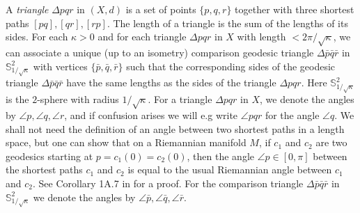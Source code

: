 \documentclass[12pt]{amsart}
\numberwithin{equation}{section}
\theoremstyle{remark}
\begin{document}
	A {\sl triangle} $\Delta pqr$ in $(X,d)$ is a set of points $\{p,q,r\}$ together with three shortest paths $[pq], [qr], [rp]$. The length of a triangle is the sum of the lengths of its sides. For each $\kappa >0$ and for each triangle $\Delta pqr$ in $X$ with length $< 2\pi / \sqrt\kappa$, we can associate a unique (up to an isometry) comparison geodesic triangle $\Delta \bar{p}\bar{q}\bar{r}$ in $\mathbb S^2_{1/\sqrt\kappa}$ with vertices $\{\bar{p},\bar{q},\bar{r}\}$ such that the corresponding sides of the geodesic triangle $\Delta \bar{p}\bar{q}\bar{r}$ have the same lengths as the sides of the triangle $\Delta pqr$. Here $\mathbb S^2_{1/\sqrt\kappa}$ is the $2$-sphere with radius $1/\sqrt{\kappa}$. For a triangle $\Delta pqr $ in $X$, we denote the angles by $\angle p, \angle q, \angle r$, and if confusion arises we will e.g write $\angle pqr$ for the angle $\angle q$. We shall not need the definition of an angle between two shortest paths in a length space, but one can show that on a Riemannian manifold $M$, if $c_1$ and $c_2$ are two geodesics starting at $p = c_1(0) = c_2(0)$, then the angle $\angle p \in [0,\pi]$ between the shortest paths $c_1$ and $c_2$ is equal to the usual Riemannian angle between $c_1$ and $c_2$. See Corollary 1A.7 in \cite{bridson} for a proof. For the comparison triangle  $\Delta \bar{p}\bar{q}\bar{r}$ in $\mathbb S^2_{1/\sqrt\kappa}$ we denote the angles by $\angle \bar{p}, \angle \bar{q}, \angle \bar{r}$. 
	
\end{document}
